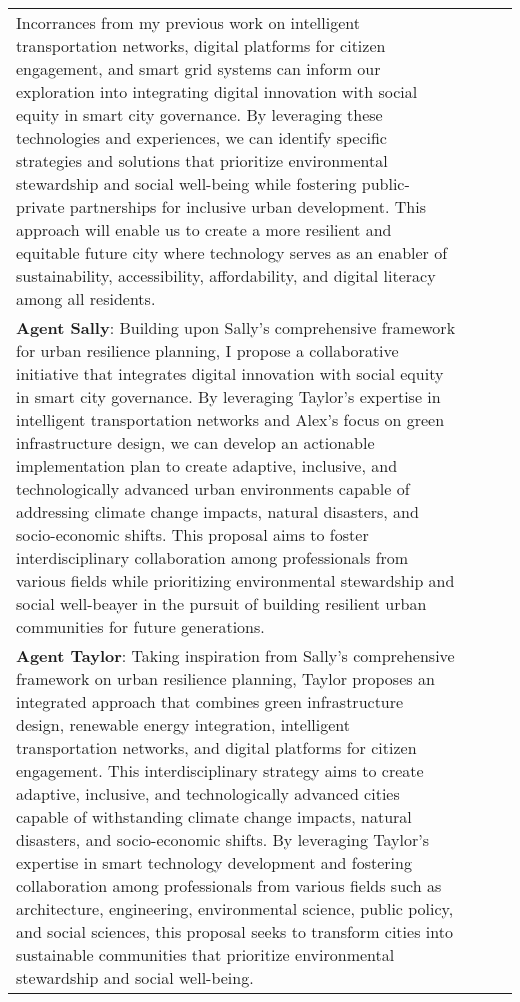 \documentclass{article}
\begin{document}
\begin{appendix}
\begin{tabular}{| m{2cm} | m{3cm} | m{5cm} | m{5cm} |}
Incorrances from my previous work on intelligent transportation networks, digital platforms for citizen engagement, and smart grid systems can inform our exploration into integrating digital innovation with social equity in smart city governance. By leveraging these technologies and experiences, we can identify specific strategies and solutions that prioritize environmental stewardship and social well-being while fostering public-private partnerships for inclusive urban development. This approach will enable us to create a more resilient and equitable future city where technology serves as an enabler of sustainability, accessibility, affordability, and digital literacy among all residents. \\ 
\textbf{Agent Sally}: Building upon Sally's comprehensive framework for urban resilience planning, I propose a collaborative initiative that integrates digital innovation with social equity in smart city governance. By leveraging Taylor's expertise in intelligent transportation networks and Alex's focus on green infrastructure design, we can develop an actionable implementation plan to create adaptive, inclusive, and technologically advanced urban environments capable of addressing climate change impacts, natural disasters, and socio-economic shifts. This proposal aims to foster interdisciplinary collaboration among professionals from various fields while prioritizing environmental stewardship and social well-beayer in the pursuit of building resilient urban communities for future generations. \\ 
\textbf{Agent Taylor}: Taking inspiration from Sally's comprehensive framework on urban resilience planning, Taylor proposes an integrated approach that combines green infrastructure design, renewable energy integration, intelligent transportation networks, and digital platforms for citizen engagement. This interdisciplinary strategy aims to create adaptive, inclusive, and technologically advanced cities capable of withstanding climate change impacts, natural disasters, and socio-economic shifts. By leveraging Taylor's expertise in smart technology development and fostering collaboration among professionals from various fields such as architecture, engineering, environmental science, public policy, and social sciences, this proposal seeks to transform cities into sustainable communities that prioritize environmental stewardship and social well-being.


\end{tabular}
\end{appendix}
\end{document}
